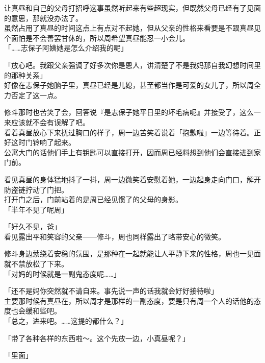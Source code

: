 让真昼和自己的父母打招呼这事虽然听起来有些超现实，但既然父母已经有了见面的意思，那就没办法了。\\

虽然占用了真昼的时间这点上有点对不起她，但从父亲的性格来看要是不跟真昼见个面怕是不会善罢甘休的，所以周希望真昼能忍一小会儿。\\

「……志保子阿姨她是怎么介绍我的呢」

「放心吧。我跟父亲强调了好多次你是恩人，讲清楚了不是我妈那自我幻想时间里的那种关系」\\

好像在志保子她脑子里，真昼已经是儿媳，甚至都当作是可爱的女儿了，所以周全力否定了这一点。

修斗那时也苦笑了会，回答说『是志保子她平日里的坏毛病呢』并接受了，这么一来应该就不会有误解了吧。\\

看着真昼放心下来抚过胸口的样子，周一边苦笑着说着「抱歉啦」一边等待着。正好这时门铃响了起来。\\

公寓大门的话他们手上有钥匙可以直接打开，因而周已经料想到他们会直接进到家门前。

看见真昼的身体猛地抖了一抖，周一边微笑着安慰着她，一边起身走向门口，解开防盗链拧动了门把。\\

打开门之后，门前站着的是周已经见惯了的父母的身影。\\

「半年不见了呢周」

「好久不见，爸」\\

看见露出平和笑容的父亲——修斗，周也同样露出了略带安心的微笑。

修斗身边萦绕着安稳的氛围，是那种在一起就能让人平静下来的性格，周也一见面就不禁放松了下来。\\

「对妈的时候就是一副鬼态度呢……」

「还不是妈你突然就不请自来。事先说一声的话我就会好好接待啦」\\

主要那时候有真昼在，所以周才是那样的一副态度，要是只有周一个人的话他的态度也会缓和些吧。\\

「总之，进来吧。……这提的都什么？」

「带了各种各样的东西啦～。这个先放一边，小真昼呢？」

「里面」\\

